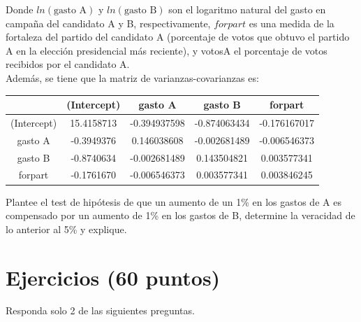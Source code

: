 \documentclass[10pt,a4paper]{article}
\begin{document}
\begin{enumerate}



Donde $ln(\text{gasto A})$ y $ln(\text{gasto B})$ son el logaritmo natural del gasto en campaña del candidato A y B, respectivamente, $forpart$ es una medida de la fortaleza del partido del candidato A (porcentaje de votos que obtuvo el partido A en la elección presidencial más reciente), y votosA el porcentaje de votos recibidos por el candidato A.\\

Además, se tiene que la matriz de varianzas-covarianzas es:

\begin{table}[H]
    \centering
    \begin{tabular}{c|c|c|c|c}
 & (Intercept) & gasto A & gasto B	& forpart\\\hline
(Intercept)	& 15.4158713 & -0.394937598	& -0.874063434 & -0.176167017\\
gasto A	& -0.3949376 & 0.146038608 & -0.002681489 & -0.006546373\\
gasto B	& -0.8740634 & -0.002681489	& 0.143504821 & 0.003577341\\
forpart	& -0.1761670 & -0.006546373	& 0.003577341 & 0.003846245\\
    \end{tabular}
\end{table}

Plantee el test de hipótesis de que un aumento de un 1\% en los gastos de A es compensado por un aumento de 1\% en los gastos de B, determine la veracidad de lo anterior al 5\% y explique.\\

    
    \end{enumerate}

\section{Ejercicios (60 puntos)}

Responda solo 2 de las siguientes preguntas.
\end{document}
